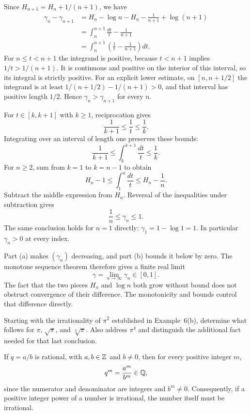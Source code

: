 Since $H_{n+1}=H_n+1/(n+1)$, we have
\[
 \begin{aligned}
 \gamma_n-\gamma_{n+1}
 &=H_n-\log n-H_n-\frac1{n+1}+\log(n+1)\\
 &=\int_n^{n+1}\frac{dt}{t}-\frac1{n+1}\\
 &=\int_n^{n+1}\left(\frac1t-\frac1{n+1}\right)dt.
 \end{aligned}
\]
For $n\le t<n+1$ the integrand is positive, because $t<n+1$
implies $1/t>1/(n+1)$. It is continuous and positive on the
interior of this interval, so its integral is strictly positive.
For an explicit lower estimate, on $[n,n+1/2]$ the integrand
is at least $1/(n+1/2)-1/(n+1)>0$, and that interval has positive
length $1/2$. Hence $\gamma_n>\gamma_{n+1}$ for every $n$.

For $t\in[k,k+1]$ with $k\ge1$, reciprocation gives
\[
 \frac1{k+1}\le\frac1t\le\frac1k.
\]
Integrating over an interval of length one preserves these bounds:
\[
 \frac1{k+1}\le\int_k^{k+1}\frac{dt}{t}\le\frac1k.
\]
For $n\ge2$, sum from $k=1$ to $k=n-1$ to obtain
\[
 H_n-1\le\int_1^n\frac{dt}{t}\le H_n-\frac1n.
\]
Subtract the middle expression from $H_n$. Reversal of the
inequalities under subtraction gives
\[
 \frac1n\le\gamma_n\le1.
\]
The same conclusion holds for $n=1$ directly:
$\gamma_1=1-\log1=1$. In particular $\gamma_n>0$ at every index.

Part (a) makes $(\gamma_n)$ decreasing, and part (b) bounds it
below by zero. The monotone sequence theorem therefore gives a
finite real limit
\[
 \gamma=\lim_{n\to\infty}\gamma_n\in[0,1].
\]
The fact that the two pieces $H_n$ and $\log n$ both grow without
bound does not obstruct convergence of their difference. The
monotonicity and bounds control that difference directly.

\goal Starting with the irrationality of $\pi^2$ established in
Example~6(b), determine what follows for $\pi$, $\sqrt\pi$, and
$\sqrt[3]\pi$. Also address $\pi^4$ and distinguish the additional
fact needed for that last conclusion.

If $q=a/b$ is rational, with $a,b\in\mathbb{Z}$ and $b\ne0$, then for
every positive integer $m$,
\[
 q^m=\frac{a^m}{b^m}\in\mathbb{Q},
\]
since the numerator and denominator are integers and $b^m\ne0$.
Consequently, if a positive integer power of a number is
irrational, the number itself must be irrational.

